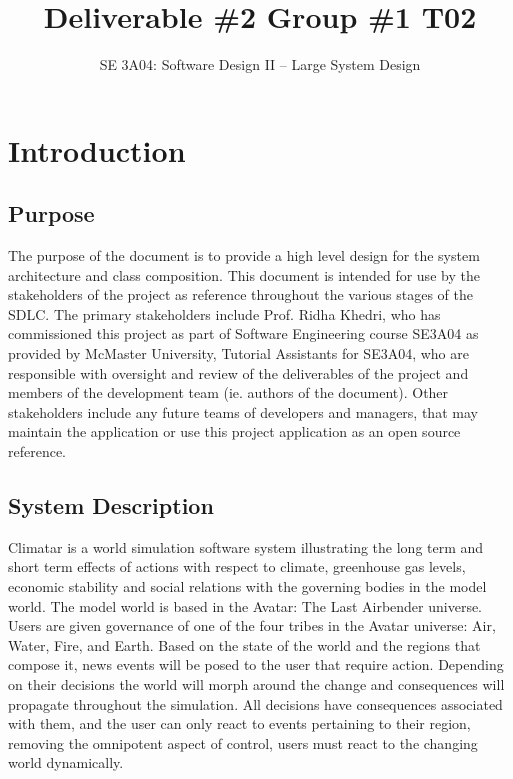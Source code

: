 \documentclass[]{article}
\title{Deliverable \#2 Group \#1 T02}
\author{SE 3A04: Software Design II -- Large System Design}
\date{}
\begin{document}
\maketitle	

\section{Introduction}
\label{sec:introduction}

\subsection{Purpose}
\label{sub:purpose}
The purpose of the document is to provide a high level design for the system architecture and class composition. This document is intended for use by the stakeholders of the project as reference throughout the various stages of the SDLC. The primary stakeholders include Prof. Ridha Khedri, who has commissioned this project as part of Software Engineering course SE3A04 as provided by McMaster University, Tutorial Assistants for SE3A04, who are responsible with oversight and review of the deliverables of the project and members of the development team (ie. authors of the document). Other stakeholders include any future teams of developers and managers, that may maintain the application or use this project application as an open source reference.


\subsection{System Description}
\label{sub:system_description}
Climatar is a world simulation software system illustrating the long term and short term effects of actions with respect to climate, greenhouse gas levels, economic stability and social relations with the governing bodies in the model world. The model world is based in the Avatar: The Last Airbender universe. Users are given governance of one of the four tribes in the Avatar universe: Air, Water, Fire, and Earth. Based on the state of the world and the regions that compose it, news events will be posed to the user that require action. Depending on their decisions the world will morph around the change and consequences will propagate throughout the simulation. All decisions have consequences associated with them, and the user can only react to events pertaining to their region, removing the omnipotent aspect of control, users must react to the changing world dynamically.
\end{document}
